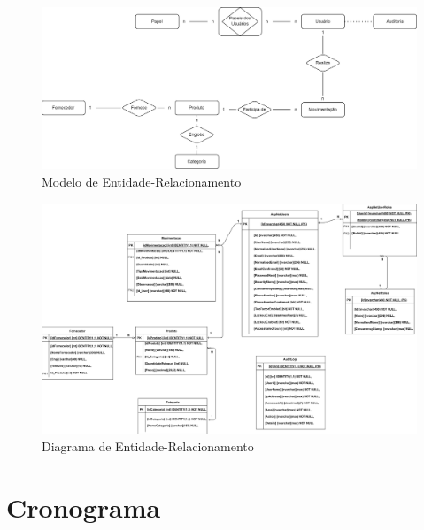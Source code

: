 \documentclass[
	12pt,				%
	openany,			%
	twoside,			%
	a4paper,			%
	english,			%
	brazil				%
	]{abntex2}
\begin{document}
\begin{figure}[h!]
    \centering
\includegraphics[width=1.0\textwidth]{Figuras/MERestoque.png}
    \caption{Modelo de Entidade-Relacionamento}
\end{figure}


\FloatBarrier


\begin{figure}[h!]
    \centering
\includegraphics[width=1.0\textwidth]{Figuras/DERestoque.png}
    \caption{Diagrama de Entidade-Relacionamento}
\end{figure}

\FloatBarrier








\section{Cronograma}
\end{document}
